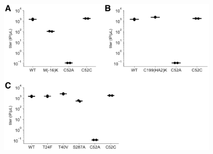 \documentclass[9pt,twocolumn,twoside]{pnas-new}
\begin{document}
\begin{suppfigure}[H]
\centerline{\includegraphics[width=0.8\textwidth]{figs/supp_point_mut_validation/point_mut_validation.pdf}}
\caption{\label{suppfig:point_mut_validation_supp}
{\bf Viral titers of individual Perth/2009 H3 HA point mutants.}
Influenza GFP viruses carrying wildtype or single point mutants of the Perth/2009 HA were rescued by reverse genetics in duplicate. 
Viral transfection supernatant was harvested at 53 hours post-transfection and titered by flow cytometry in MDCK-SIAT1-TMPRSS2 cells.
Note that the wildtype, C52A and C52C mutant virus titers shown in each panel represent the same duplicate measurements.
The points mark each duplicate and the bar marks the mean.
(A) The start codon mutant M(-16)K reaches titers approximately one log less than those of wildtype. 
The C52A mutant fails to reach high titers, and the C52C synonymous variant grows to titers comparable to those of wildtype virus.
(B) The transmembrane domain mutant C199(HA2)K grows to higher titers than the wildtype.
(C) The T24F and T40V mutants, which remove glycosylation motifs, attain titers similar to or higher than wildtype, respectively. 
The S287A mutant, which also removes a glycosylation motif, does not grow as well as wildtype virus.
}
\end{suppfigure}

\begin{suppdata}[H]
\caption{\label{suppdata:PerthHA}
Genbank file giving the full sequence of the bidirectional reverse-genetics plasmid pHW-Perth09-HA-G78D-T212I, which encodes the wildtype HA sequence used in this study.
}
\end{suppdata}

\begin{suppdata}[H]
\caption{\label{suppdata:bcsubamp_primers}
Excel file providing the primers used to generate the barcoded subamplicons for Perth/2009 HA deep sequencing.
}
\end{suppdata}
\end{document}
